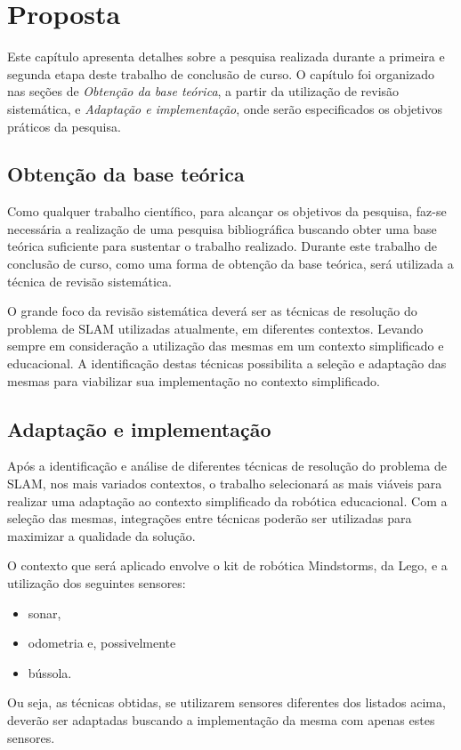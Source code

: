 \chapter[Proposta]{Proposta}

Este capítulo apresenta detalhes sobre a pesquisa realizada durante a primeira e segunda etapa deste trabalho de conclusão de curso. O capítulo foi organizado nas seções de \textit{Obtenção da base teórica}, a partir da utilização de revisão sistemática, e \textit{Adaptação e implementação}, onde serão especificados os objetivos práticos da pesquisa.

\section{Obtenção da base teórica} %
\label{sec:obtenção_da_base_teórica}
	
	Como qualquer trabalho científico, para alcançar os objetivos da pesquisa, faz-se necessária a realização de uma pesquisa bibliográfica buscando obter uma base teórica suficiente para sustentar o trabalho realizado. Durante este trabalho de conclusão de curso, como uma forma de obtenção da base teórica, será utilizada a técnica de revisão sistemática.

	O grande foco da revisão sistemática deverá ser as técnicas de resolução do problema de SLAM utilizadas atualmente, em diferentes contextos. Levando sempre em consideração a utilização das mesmas em um contexto simplificado e educacional. A identificação destas técnicas possibilita a seleção e adaptação das mesmas para viabilizar sua implementação no contexto simplificado.

\section{Adaptação e implementação} %
\label{sec:adaptação_e_implementação}

	Após a identificação e análise de diferentes técnicas de resolução do problema de SLAM, nos mais variados contextos, o trabalho selecionará as mais viáveis para realizar uma adaptação ao contexto simplificado da robótica educacional. 
	Com a seleção das mesmas, integrações entre técnicas poderão ser utilizadas para maximizar a qualidade da solução.

	O contexto que será aplicado envolve o kit de robótica Mindstorms, da Lego, e a utilização dos seguintes sensores:

	\begin{itemize}
		\item sonar,
		\item odometria e, possivelmente
		\item bússola.
	\end{itemize}

	Ou seja, as técnicas obtidas, se utilizarem sensores diferentes dos listados acima, deverão ser adaptadas buscando a implementação da mesma com apenas estes sensores.
	
